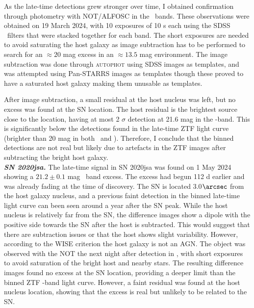 \documentclass[a4paper,oneside,12pt, class=Latex/Classes/PhDthesisPSnPDF, crop=false]{standalone}
\begin{document}
As the late-time detections grew stronger over time, I obtained confirmation through photometry with NOT/ALFOSC in the \ztfg\ztfr\ztfi\ bands. These observations were obtained on 19 March 2024, with 10 exposures of 10 s each using the SDSS \ztfg\ztfr\ztfi\ filters that were stacked together for each band. The short exposures are needed to avoid saturating the host galaxy as image subtraction has to be performed to search for an $\approx 20$ mag excess in an $\approx 13.5$ mag environment. The image subtraction was done through \textsc{autophot} \citep{Autophot} using SDSS images as templates, and was attempted using Pan-STARRS images as templates though these proved to have a saturated host galaxy making them unusable as templates.

After image subtraction, a small residual at the host nucleus was left, but no excess was found at the SN location. The host residual is the brightest source close to the location, having at most 2 $\sigma$ detection at 21.6 mag in the \ztfi-band. This is significantly below the detections found in the late-time ZTF light curve (brighter than 20 mag in both \ztfr\ and \ztfi). Therefore, I conclude that the binned detections are not real but likely due to artefacts in the ZTF images after subtracting the bright host galaxy.\\


\textit{\textbf{SN 2020jsa.}}
The late-time signal in SN 2020jsa was found on 1 May 2024 showing a $21.2\pm0.1$ mag \ztfr\ band excess. The excess had begun 112 d earlier and was already fading at the time of discovery. The SN is located 3.0$\arcsec$ from the host galaxy nucleus, and a previous faint detection in the binned late-time light curve can been seen around a year after the SN peak. While the host nucleus is relatively far from the SN, the difference images show a dipole with the positive side towards the SN after the host is subtracted. This would suggest that there are subtraction issues or that the host shows slight variability. However, according to the WISE criterion the host galaxy is not an AGN. The object was observed with the NOT the next night after detection in \ztfg\ztfr\ztfi, with short exposures to avoid saturation of the bright host and nearby stars. The resulting difference images found no excess at the SN location, providing a deeper limit than the binned ZTF \ztfr-band light curve. However, a faint residual was found at the host nucleus location, showing that the excess is real but unlikely to be related to the SN.\\
\end{document}
